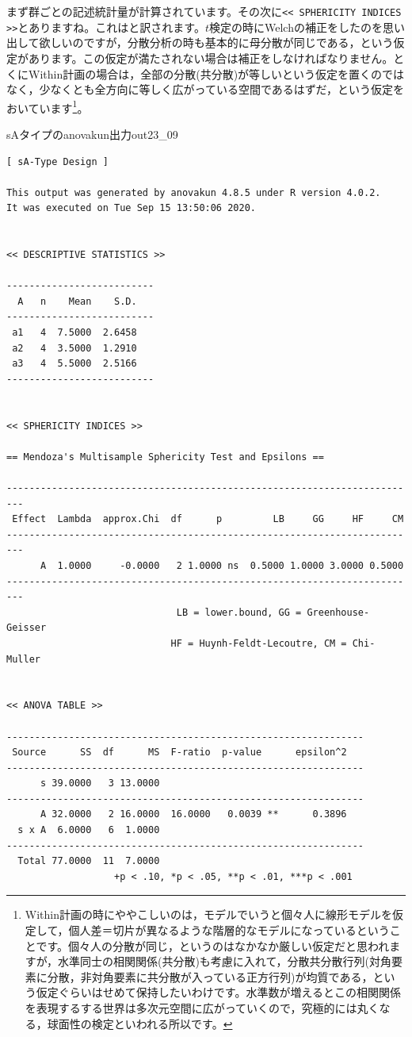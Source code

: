 \documentclass{ltjbook}
\begin{document}
まず群ごとの記述統計量が計算されています。その次に\verb|<< SPHERICITY INDICES >>|とありますね。これはと訳されます。$t$検定の時にWelchの補正をしたのを思い出して欲しいのですが，分散分析の時も基本的に母分散が同じである，という仮定があります。この仮定が満たされない場合は補正をしなければなりません。とくにWithin計画の場合は，全部の分散(共分散)が等しいという仮定を置くのではなく，少なくとも全方向に等しく広がっている空間であるはずだ，という仮定をおいています\footnote{Within計画の時にややこしいのは，モデルでいうと個々人に線形モデルを仮定して，個人差＝切片が異なるような階層的なモデルになっているということです。個々人の分散が同じ，というのはなかなか厳しい仮定だと思われますが，水準同士の相関関係(共分散)も考慮に入れて，分散共分散行列(対角要素に分散，非対角要素に共分散が入っている正方行列)が均質である，という仮定ぐらいはせめて保持したいわけです。水準数が増えるとこの相関関係を表現するする世界は多次元空間に広がっていくので，究極的には丸くなる，球面性の検定といわれる所以です。 }。
\begin{Rscreen}{sAタイプのanovakun出力}{out23_09}
	\begin{verbatim}
[ sA-Type Design ]

This output was generated by anovakun 4.8.5 under R version 4.0.2.
It was executed on Tue Sep 15 13:50:06 2020.

 
<< DESCRIPTIVE STATISTICS >>

--------------------------
  A   n    Mean    S.D. 
--------------------------
 a1   4  7.5000  2.6458 
 a2   4  3.5000  1.2910 
 a3   4  5.5000  2.5166 
--------------------------


<< SPHERICITY INDICES >>

== Mendoza's Multisample Sphericity Test and Epsilons ==

-------------------------------------------------------------------------
 Effect  Lambda  approx.Chi  df      p         LB     GG     HF     CM 
-------------------------------------------------------------------------
      A  1.0000     -0.0000   2 1.0000 ns  0.5000 1.0000 3.0000 0.5000 
-------------------------------------------------------------------------
                              LB = lower.bound, GG = Greenhouse-Geisser
                             HF = Huynh-Feldt-Lecoutre, CM = Chi-Muller


<< ANOVA TABLE >>

---------------------------------------------------------------
 Source      SS  df      MS  F-ratio  p-value      epsilon^2 
---------------------------------------------------------------
      s 39.0000   3 13.0000                                  
---------------------------------------------------------------
      A 32.0000   2 16.0000  16.0000   0.0039 **      0.3896 
  s x A  6.0000   6  1.0000                                  
---------------------------------------------------------------
  Total 77.0000  11  7.0000                                  
                   +p < .10, *p < .05, **p < .01, ***p < .001
\end{verbatim}
\end{Rscreen}
\end{document}
